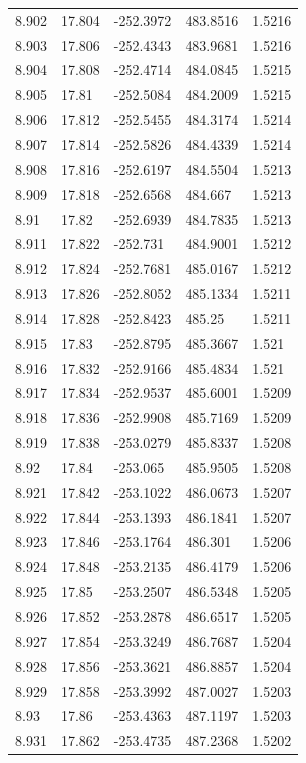 \begin{tabular}{lllll}
8.902 & 17.804 & -252.3972 & 483.8516 & 1.5216 \\
8.903 & 17.806 & -252.4343 & 483.9681 & 1.5216 \\
8.904 & 17.808 & -252.4714 & 484.0845 & 1.5215 \\
8.905 & 17.81 & -252.5084 & 484.2009 & 1.5215 \\
8.906 & 17.812 & -252.5455 & 484.3174 & 1.5214 \\
8.907 & 17.814 & -252.5826 & 484.4339 & 1.5214 \\
8.908 & 17.816 & -252.6197 & 484.5504 & 1.5213 \\
8.909 & 17.818 & -252.6568 & 484.667 & 1.5213 \\
8.91 & 17.82 & -252.6939 & 484.7835 & 1.5213 \\
8.911 & 17.822 & -252.731 & 484.9001 & 1.5212 \\
8.912 & 17.824 & -252.7681 & 485.0167 & 1.5212 \\
8.913 & 17.826 & -252.8052 & 485.1334 & 1.5211 \\
8.914 & 17.828 & -252.8423 & 485.25 & 1.5211 \\
8.915 & 17.83 & -252.8795 & 485.3667 & 1.521 \\
8.916 & 17.832 & -252.9166 & 485.4834 & 1.521 \\
8.917 & 17.834 & -252.9537 & 485.6001 & 1.5209 \\
8.918 & 17.836 & -252.9908 & 485.7169 & 1.5209 \\
8.919 & 17.838 & -253.0279 & 485.8337 & 1.5208 \\
8.92 & 17.84 & -253.065 & 485.9505 & 1.5208 \\
8.921 & 17.842 & -253.1022 & 486.0673 & 1.5207 \\
8.922 & 17.844 & -253.1393 & 486.1841 & 1.5207 \\
8.923 & 17.846 & -253.1764 & 486.301 & 1.5206 \\
8.924 & 17.848 & -253.2135 & 486.4179 & 1.5206 \\
8.925 & 17.85 & -253.2507 & 486.5348 & 1.5205 \\
8.926 & 17.852 & -253.2878 & 486.6517 & 1.5205 \\
8.927 & 17.854 & -253.3249 & 486.7687 & 1.5204 \\
8.928 & 17.856 & -253.3621 & 486.8857 & 1.5204 \\
8.929 & 17.858 & -253.3992 & 487.0027 & 1.5203 \\
8.93 & 17.86 & -253.4363 & 487.1197 & 1.5203 \\
8.931 & 17.862 & -253.4735 & 487.2368 & 1.5202 \\

\end{tabular}
